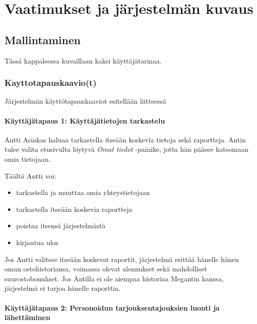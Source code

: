 \chapter{Vaatimukset ja järjestelmän kuvaus} %
\label{kuvaus} %
\thispagestyle{fancy} %


\section{Mallintaminen}  %
    Tässä kappaleessa kuvaillaan kaksi käyttäjätarinaa. 

\subsection{Kayttotapauskaavio(t)}    %

    Järjestelmän käyttötapauskaaviot esitellään liitteessä %

\subsubsection{Käyttäjätapaus 1: Käyttäjätietojen tarkastelu}   %

    Antti Asiakas haluaa tarkastella itseään koskevia tietoja sekä raportteja. Antin tulee valita etusivulta löytyvä
    \textit{Omat tiedot} -painike, jotta hän pääsee katsomaan omia tietojaan. 

    Täältä Antti voi:

    \begin{itemize}
        \item tarkastella ja muuttaa omia yhteystietojaan
        \item tarkastella itseään koskevia raportteja
        \item poistaa itsensä järjestelmästä
        \item kirjautua ulos
    \end{itemize}

    Jos Antti valitsee itseään koskevat raportit, järjestelmä esittää hänelle hänen oman ostohistoriansa,
    voimassa olevat alennukset sekä mahdolliset suurostobonukset.
    Jos Antilla ei ole aiempaa historiaa Megantin kanssa, järjestelmä ei tarjoa hänelle raporttia.

\subsubsection{Käyttäjätapaus 2: Personoidun tarjouksen\/tajouksien luonti ja lähettäminen}     %

